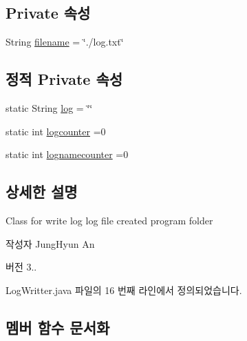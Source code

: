 \subsection*{Private 속성}
\begin{DoxyCompactItemize}
\item 
String \mbox{\hyperlink{classcom_1_1github_1_1aites_1_1framework_1_1log_1_1_log_writter_ad2861afbf5d3a065972fcb30ac4c84f4}{filename}} = \char`\"{}./log.\+txt\char`\"{}
\end{DoxyCompactItemize}
\subsection*{정적 Private 속성}
\begin{DoxyCompactItemize}
\item 
static String \mbox{\hyperlink{classcom_1_1github_1_1aites_1_1framework_1_1log_1_1_log_writter_a4166c55fe968efbdc9c0c00a14f76806}{log}} = \char`\"{}\char`\"{}
\item 
static int \mbox{\hyperlink{classcom_1_1github_1_1aites_1_1framework_1_1log_1_1_log_writter_aeb6fa2f3b7b77138ad33aa363ad451c8}{logcounter}} =0
\item 
static int \mbox{\hyperlink{classcom_1_1github_1_1aites_1_1framework_1_1log_1_1_log_writter_a641601db808c1aeeae151b0512776e4f}{lognamecounter}} =0
\end{DoxyCompactItemize}


\subsection{상세한 설명}
Class for write log log file created program folder 

\begin{DoxyAuthor}{작성자}
Jung\+Hyun An 
\end{DoxyAuthor}
\begin{DoxyVersion}{버전}
3.. 
\end{DoxyVersion}


Log\+Writter.\+java 파일의 16 번째 라인에서 정의되었습니다.



\subsection{멤버 함수 문서화}
\mbox{\label{classcom_1_1github_1_1aites_1_1framework_1_1log_1_1_log_writter_a2f315148575291db6f24553791068c42}} 
